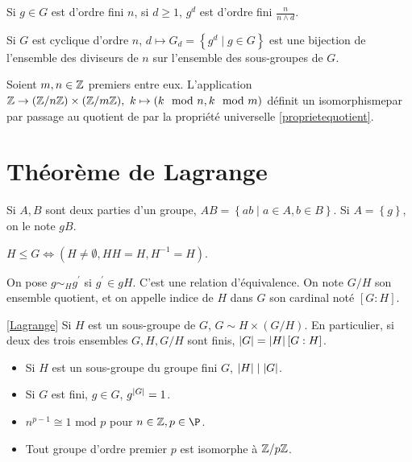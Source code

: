 \documentclass{cours}
\begin{document}
\begin{remark}
    Si $g \in G$ est d'ordre fini $n$, si $d \geq 1$, $g^{d}$ est d'ordre fini $\frac{n}{n \wedge d}$.
\end{remark}

\begin{proposition}
    Si $G$ est cyclique d'ordre $n$, $d \mapsto G_{d} = \left\{g^{d} \mid g \in G\right\}$ est une bijection de l'ensemble des diviseurs de $n$ sur l'ensemble des sous-groupes de $G$. 
\end{proposition}

\begin{theorem}[Chinois]
    Soient $m, n \in \mathbb{Z}$ premiers entre eux. L'application $\mathbb{Z} \rightarrow (\mathbb{Z}/n\mathbb{Z}) \times (\mathbb{Z}/m\mathbb{Z}),\ k \mapsto \left(k \mod n, k \mod m\right)$ définit un isomorphismepar par passage au quotient de par la propriété universelle \ref{proprietequotient}.
\end{theorem}

\section{Théorème de Lagrange} %
\begin{definition}
    Si $A, B$ sont deux parties d'un groupe, $AB = \left\{ab \mid a \in A, b\in B\right\}$. Si $A = \left\{g\right\}$, on le note $gB$.
\end{definition}
\begin{lemma}
    $H \leq G \Leftrightarrow \left(H \neq \emptyset, HH = H, H^{-1} = H\right)$.
\end{lemma}
\begin{definition}
    On pose $g\sim_{H}g^{'}$ si $g^{'} \in gH$. C'est une relation d'équivalence. On note $G/H$ son ensemble quotient, et on appelle indice de $H$ dans $G$ son cardinal noté $[G : H]$.
\end{definition}

\begin{theorem}[Lagrange]\ref{Lagrange}
    Si $H$ est un sous-groupe de $G$, $G \sim H \times (G/H)$. En particulier, si deux des trois ensembles $G, H, G/H$ sont finis, $\left|G\right| = \left|H\right|\left[G : H\right]$.
\end{theorem}
\begin{corollary}
    \begin{itemize}
        \item Si $H$ est un sous-groupe du groupe fini $G$, $\left|H\right| \mid \left|G\right|$.
        \item Si $G$ est fini, $g\in G$, $g^{\left|G\right|} = 1$.
        \item $n^{p-1} \cong 1 \text{ mod } p$ pour $n\in \Z, p \in \P$.
        \item Tout groupe d'ordre premier $p$ est isomorphe à $\mathbb{Z}/p\mathbb{Z}$.
    \end{itemize}
\end{corollary}
\end{document}
